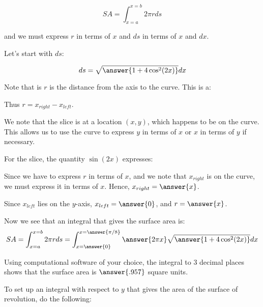 \documentclass{ximera}
\begin{document}
\begin{exercise}
\[ SA = \int_{x=a}^{x=b} 2 \pi r ds\]

and we must express $r$ in terms of $x$ and $ds$ in terms of $x$ and $dx$.  


Let's start with $ds$: 

\[
ds = \sqrt{\answer{1+4\cos^2(2x)}} dx
\]


\begin{exercise}
Note that is $r$ is the distance from the axis to the curve. This is a:

\begin{multipleChoice}
\end{multipleChoice} 
Thus $r=x_{right}-x_{left}$.  

We note that the slice is at a location $(x,y)$, which happens to be on the curve.  This allows us to use the curve to express $y$ in terms of $x$ or $x$ in terms of $y$ if necessary.  

For the slice, the quantity $\sin(2x)$ expresses:
\begin{multipleChoice}
\end{multipleChoice} 

Since we have to express $r$ in terms of $x$, and we note that $x_{right}$ is on the curve, we must express it in terms of $x$.  Hence, $x_{right} = \answer{x}$.

Since $x_{left}$ lies on the $y$-axis, $x_{left} = \answer{0}$, and $r= \answer{x}$.

\end{exercise}

\begin{exercise}
Now we see that an integral that gives the surface area is: 
\[
SA= \int_{x=a}^{x=b} 2 \pi r ds = \int_{x=\answer{0}}^{x=\answer{\pi/8}} \answer{2 \pi x} \sqrt{\answer{1+4\cos^2(2x)}} dx
\]

\begin{exercise}
Using computational software of your choice, the integral to 3 decimal places shows that the surface area is $\answer{.957}$ square units.  
\end{exercise}

\end{exercise}


To set up an integral with respect to $y$ that gives the area of the surface of revolution, do the following:  


\end{exercise}
\end{document}
